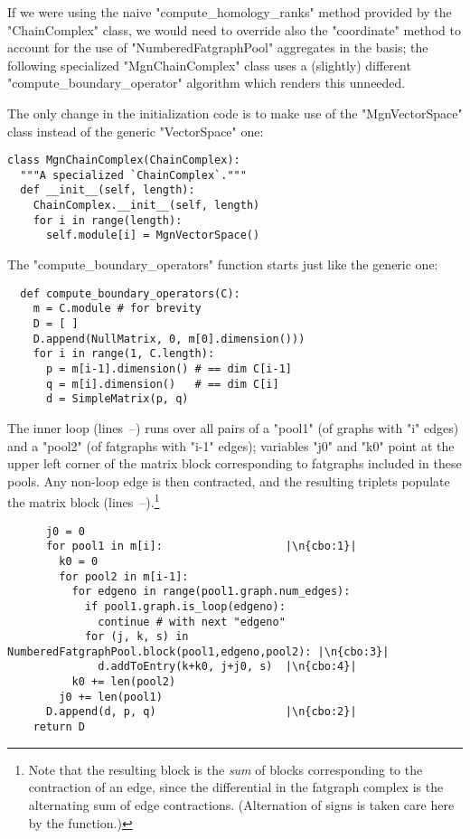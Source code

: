If we were using the naive "compute_homology_ranks" method provided by
the "ChainComplex" class, we would need to override also the
"coordinate" method to account for the use of "NumberedFatgraphPool"
aggregates in the basis; the following specialized "MgnChainComplex"
class uses a (slightly) different "compute_boundary_operator"
algorithm which renders this unneeded.

The only change in the initialization code is to make use of the
"MgnVectorSpace" class instead of the generic "VectorSpace" one:
\begin{lstlisting}
class MgnChainComplex(ChainComplex):
  """A specialized `ChainComplex`."""
  def __init__(self, length):
    ChainComplex.__init__(self, length)
    for i in range(length):
      self.module[i] = MgnVectorSpace()

\end{lstlisting}

The "compute_boundary_operators" function starts just like the generic
one: 
\begin{lstlisting}
  def compute_boundary_operators(C):
    m = C.module # for brevity
    D = [ ]
    D.append(NullMatrix, 0, m[0].dimension()))
    for i in range(1, C.length):
      p = m[i-1].dimension() # == dim C[i-1]
      q = m[i].dimension()   # == dim C[i]
      d = SimpleMatrix(p, q)
\end{lstlisting}
The inner loop (lines~--) runs over all pairs of a
"pool1" (of graphs with "i" edges) and a "pool2" (of fatgraphs with
"i-1" edges); variables "j0" and "k0" point at the upper left corner
of the matrix block corresponding to fatgraphs included in these
pools.  Any non-loop edge is then contracted, and the resulting
triplets populate the matrix block
(lines~--).\footnote{Note that the resulting block
  is the \emph{sum} of blocks corresponding to the contraction of an
  edge, since the differential in the fatgraph complex is the
  alternating sum of edge contractions.  (Alternation of signs is
  taken care here by the  function.)}
\begin{lstlisting}
      j0 = 0
      for pool1 in m[i]:                   |\n{cbo:1}|
        k0 = 0
        for pool2 in m[i-1]:
          for edgeno in range(pool1.graph.num_edges):
            if pool1.graph.is_loop(edgeno):
              continue # with next "edgeno"
            for (j, k, s) in NumberedFatgraphPool.block(pool1,edgeno,pool2): |\n{cbo:3}|
              d.addToEntry(k+k0, j+j0, s)  |\n{cbo:4}|
          k0 += len(pool2)
        j0 += len(pool1)
      D.append(d, p, q)                    |\n{cbo:2}|
    return D

\end{lstlisting}



